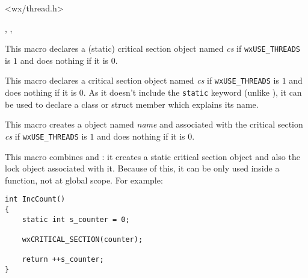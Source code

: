 
<wx/thread.h>


, , 



\label{wxcritsectdeclare}


This macro declares a (static) critical section object named {\it cs} if
{\tt wxUSE\_THREADS} is $1$ and does nothing if it is $0$.



\label{wxcritsectdeclaremember}


This macro declares a critical section object named {\it cs} if
{\tt wxUSE\_THREADS} is $1$ and does nothing if it is $0$. As it doesn't
include the {\tt static} keyword (unlike
), it can be used to declare
a class or struct member which explains its name.



\label{wxcritsectlocker}


This macro creates a 
object named {\it name} and associated with the critical section {\it cs} if
{\tt wxUSE\_THREADS} is $1$ and does nothing if it is $0$.



\label{wxcriticalsectionmacro}


This macro combines  and
: it creates a static critical
section object and also the lock object associated with it. Because of this, it
can be only used inside a function, not at global scope. For example:

\begin{verbatim}
int IncCount()
{
    static int s_counter = 0;

    wxCRITICAL_SECTION(counter);

    return ++s_counter;
}
\end{verbatim}

